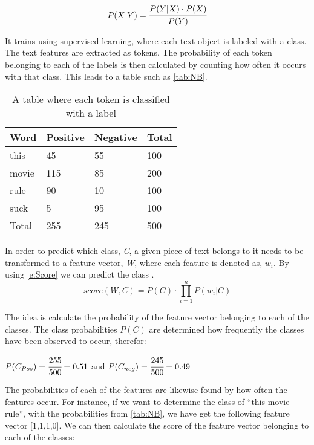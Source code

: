 \begin{equation}\label{e:Bayes}
P(X|Y) = \cfrac{P(Y|X) \cdot P(X)}{P(Y)}
\end{equation}


It trains using supervised learning, where each text object
is labeled with a class. The text features are extracted as tokens.
The probability of each token belonging to each of the labels is then
calculated by counting how often it occurs with that class. This leads to a
table such as \autoref{tab:NB}.

\begin{table}[H]
\centering
\begin{tabular}{|l|l|l|l|}
\hline
Word & Positive & Negative & Total 	\\ \hline
this & 45 & 55 & 100				\\ \hline
movie & 115 & 85 & 200				\\ \hline
rule & 90 & 10 & 100				\\ \hline
suck & 5 & 95 & 100					\\ \hline
Total & 255 & 245 & 500				\\ \hline
\end{tabular}
\caption{A table where each token is classified with a label}
\label{tab:NB}
\end{table}

In order to predict which class, \textit{C}, a given piece of text belongs to it
needs to be transformed to a feature vector, \textit{W}, where each feature is
denoted as, $w_{i}$. By using \autoref{e:Score} we can predict the class
\citep[Ch.2.1]{Bayes}.
\begin{equation}\label{e:Score}
score(W,C) = P(C) \cdot \displaystyle\prod_{i=1}^{n}P(w_{i}|C)
\end{equation}

The idea is calculate the probability of the feature vector belonging to each of
the classes. The class probabilities $P(C)$ are determined how frequently the classes have
been observed to occur, therefor:
\begin{center}
$P(C_{Pos}) = \cfrac{255}{500} = 0.51 $ and $P(C_{neg}) = \cfrac{245}{500} =
0.49 $
\end{center}
The probabilities of each of the features are likewise found by how often the
features occur. For instance, if we want to determine the class of ``this
movie rule'', with the probabilities from \autoref{tab:NB}, we have get the
following feature vector [1,1,1,0]. We can then calculate the score of
the feature vector belonging to each of the classes:

